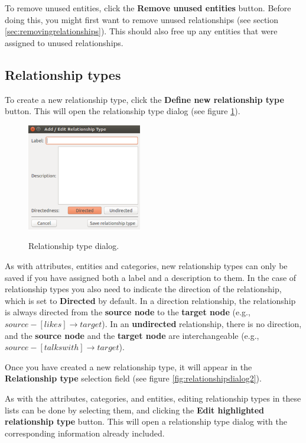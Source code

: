 \documentclass{memoir}
\begin{document}
To remove unused entities, click the \textbf{Remove unused entities} button. Before doing this, you might first want to remove unused relationships (see section \ref{sec:removingrelationships}). This should also free up any entities that were assigned to unused relationships.

\subsection{Relationship types}
\label{sec:relationshiptypes}

To create a new relationship type, click the \textbf{Define new relationship type} button. This will open the relationship type dialog (see figure \ref{fig:relationshiptypedialog}). 

\begin{figure}[h!]
  \centering
  \caption{Relationship type dialog.}
  \includegraphics[width=50mm]{Screenshot_17.pdf}
  \label{fig:relationshiptypedialog}
\end{figure}

As with attributes, entities and categories, new relationship types can only be saved if you have assigned both a label and a description to them. In the case of relationship types you also need to indicate the direction of the relationship, which is set to \textbf{Directed} by default. In a direction relationship, the relationship is always directed from the \textbf{source node} to the \textbf{target node} (e.g., \(source-[likes]\rightarrow target\)). In an \textbf{undirected} relationship, there is no direction, and the \textbf{source node} and the \textbf{target node} are interchangeable (e.g., \(source-[talks with]\rightarrow target\)). 

Once you have created a new relationship type, it will appear in the \textbf{Relationship type} selection field (see figure \ref{fig:relationshipdialog2}).

As with the attributes, categories, and entities, editing relationship types in these lists can be done by selecting them, and clicking the \textbf{Edit highlighted relationship type} button. This will open a relationship type dialog with the corresponding information already included. 
\end{document}
